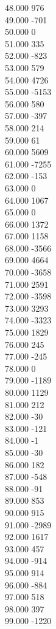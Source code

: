 { 48.000	976 \\
 49.000	-701 \\
 50.000	0 \\
 51.000	335 \\
 52.000	-823 \\
 53.000	579 \\
 54.000	4726 \\
 55.000	-5153 \\
 56.000	580 \\
 57.000	-397 \\
 58.000	214 \\
 59.000	61 \\
 60.000	5609 \\
 61.000	-7255 \\
 62.000	-153 \\
 63.000	0 \\
 64.000	1067 \\
 65.000	0 \\
 66.000	1372 \\
 67.000	1158 \\
 68.000	-3566 \\
 69.000	4664 \\
 70.000	-3658 \\
 71.000	2591 \\
 72.000	-3598 \\
 73.000	3293 \\
 74.000	-3323 \\
 75.000	1829 \\
 76.000	245 \\
 77.000	-245 \\
 78.000	0 \\
 79.000	-1189 \\
 80.000	1129 \\
 81.000	212 \\
 82.000	-30 \\
 83.000	-121 \\
 84.000	-1 \\
 85.000	-30 \\
 86.000	182 \\
 87.000	-548 \\
 88.000	-91 \\
 89.000	853 \\
 90.000	915 \\
 91.000	-2989 \\
 92.000	1617 \\
 93.000	457 \\
 94.000	-914 \\
 95.000	914 \\
 96.000	-884 \\
 97.000	518 \\
 98.000	397 \\
 99.000	-1220 \\
}
